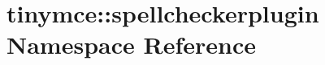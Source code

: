 \hypertarget{namespacetinymce_1_1spellcheckerplugin}{\section{tinymce\+:\+:spellcheckerplugin Namespace Reference}
\label{namespacetinymce_1_1spellcheckerplugin}
}
